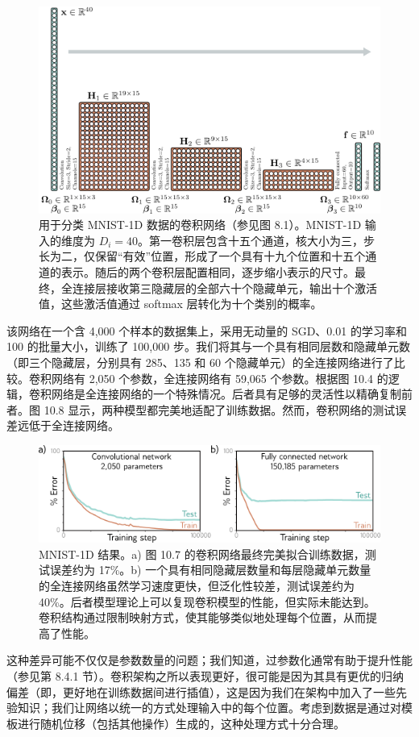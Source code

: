 \begin{figure}[ht!]
	\centering
	\includegraphics[width=0.7\linewidth]{png/chapter10/ConvDrawMNIST1D.png}
	\caption{用于分类 MNIST-1D 数据的卷积网络（参见图 8.1）。MNIST-1D 输入的维度为 \(D_i = 40\)。第一卷积层包含十五个通道，核大小为三，步长为二，仅保留“有效”位置，形成了一个具有十九个位置和十五个通道的表示。随后的两个卷积层配置相同，逐步缩小表示的尺寸。最终，全连接层接收第三隐藏层的全部六十个隐藏单元，输出十个激活值，这些激活值通过 softmax 层转化为十个类别的概率。}
\end{figure}


该网络在一个含 4,000 个样本的数据集上，采用无动量的 SGD、0.01 的学习率和 100 的批量大小，训练了 100,000 步。我们将其与一个具有相同层数和隐藏单元数（即三个隐藏层，分别具有 285、135 和 60 个隐藏单元）的全连接网络进行了比较。卷积网络有 2,050 个参数，全连接网络有 59,065 个参数。根据图 10.4 的逻辑，卷积网络是全连接网络的一个特殊情况。后者具有足够的灵活性以精确复制前者。图 10.8 显示，两种模型都完美地适配了训练数据。然而，卷积网络的测试误差远低于全连接网络。


\begin{figure}[ht!]
	\centering
	\includegraphics[width=0.7\linewidth]{png/chapter10/ConvMNIST1D.png}
	\caption{MNIST-1D 结果。a) 图 10.7 的卷积网络最终完美拟合训练数据，测试误差约为 17\%。b) 一个具有相同隐藏层数量和每层隐藏单元数量的全连接网络虽然学习速度更快，但泛化性较差，测试误差约为 40\%。后者模型理论上可以复现卷积模型的性能，但实际未能达到。卷积结构通过限制映射方式，使其能够类似地处理每个位置，从而提高了性能。}
\end{figure}


这种差异可能不仅仅是参数数量的问题；我们知道，过参数化通常有助于提升性能（参见第 8.4.1 节）。卷积架构之所以表现更好，很可能是因为其具有更优的归纳偏差（即，更好地在训练数据间进行插值），这是因为我们在架构中加入了一些先验知识；我们让网络以统一的方式处理输入中的每个位置。考虑到数据是通过对模板进行随机位移（包括其他操作）生成的，这种处理方式十分合理。

